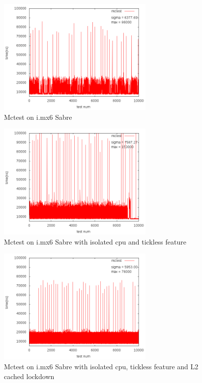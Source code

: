 \documentclass[conference]{IEEEtran}
\begin{document}
    \begin{figure} \centering \includegraphics[width=3in]{img/mctest-none.png} \caption{Mctest on i.mx6 Sabre}
    \label{fig:imx6_mctest_v} \end{figure}
    
    \begin{figure} \centering \includegraphics[width=3in]{img/mctest-iso.png} \caption{Mctest on i.mx6 Sabre with
    isolated cpu and tickless feature} \label{fig:imx6_mctest_iso} \end{figure}
    
    \begin{figure} \centering \includegraphics[width=3in]{img/mctest-lock.png} \caption{Mctest on i.mx6 Sabre with
    isolated cpu, tickless feature and L2 cached lockdown} \label{fig:imx6_mctest_lock} \end{figure}
    
\end{document}

